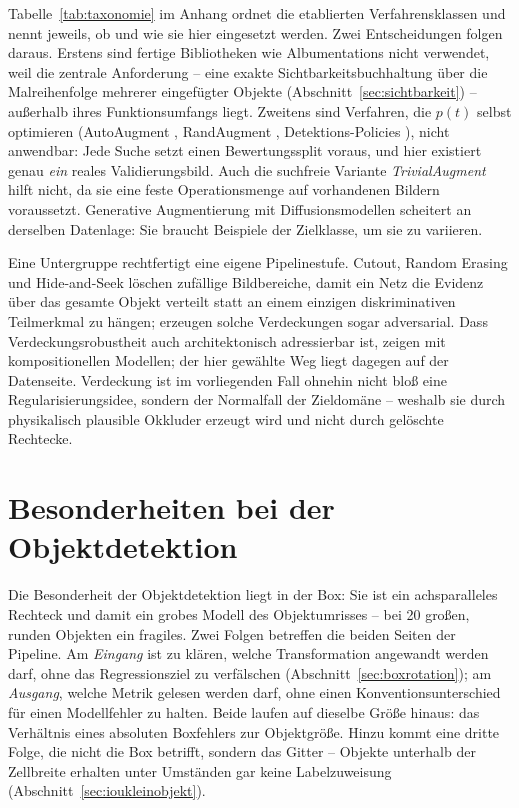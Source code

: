 Tabelle~\ref{tab:taxonomie} im Anhang ordnet die etablierten Verfahrensklassen
und nennt jeweils, ob und wie sie hier eingesetzt werden. Zwei Entscheidungen
folgen daraus. Erstens sind fertige Bibliotheken wie Albumentations
\parencite{buslaev2020} nicht verwendet, weil die zentrale Anforderung -- eine
exakte Sichtbarkeitsbuchhaltung über die Malreihenfolge mehrerer eingefügter
Objekte (Abschnitt~\ref{sec:sichtbarkeit}) -- außerhalb ihres Funktionsumfangs
liegt. Zweitens sind Verfahren, die $p(t)$ selbst optimieren (AutoAugment
\parencite{cubuk2019}, RandAugment \parencite{cubuk2020}, Detektions-Policies
\parencite{zoph2020}), nicht anwendbar: Jede Suche setzt einen Bewertungssplit
voraus, und hier existiert genau \emph{ein} reales Validierungsbild. Auch die
suchfreie Variante \emph{TrivialAugment} \parencite{mueller2021} hilft nicht, da
sie eine feste Operationsmenge auf vorhandenen Bildern voraussetzt. Generative
Augmentierung mit Diffusionsmodellen \parencite{trabucco2024} scheitert an
derselben Datenlage: Sie braucht Beispiele der Zielklasse, um sie zu variieren.

Eine Untergruppe rechtfertigt eine eigene Pipelinestufe. Cutout, Random Erasing
und Hide-and-Seek löschen zufällige Bildbereiche, damit ein Netz die Evidenz über
das gesamte Objekt verteilt statt an einem einzigen diskriminativen Teilmerkmal
zu hängen; \textcite{wang2017afastrcnn} erzeugen solche Verdeckungen sogar
adversarial. Dass Verdeckungsrobustheit auch architektonisch adressierbar ist, zeigen
\textcite{kortylewski2020} mit kompositionellen Modellen; der hier gewählte Weg
liegt dagegen auf der Datenseite. Verdeckung ist im vorliegenden Fall
ohnehin nicht bloß eine Regularisierungsidee, sondern der Normalfall der
Zieldomäne -- weshalb sie durch physikalisch plausible
Okkluder erzeugt wird und nicht durch gelöschte Rechtecke.

\section{Besonderheiten bei der Objektdetektion}
\label{sec:augdetektion}

Die Besonderheit der Objektdetektion liegt in der Box: Sie ist ein achsparalleles
Rechteck und damit ein grobes Modell des Objektumrisses -- bei 20\px{} großen,
runden Objekten ein fragiles. Zwei Folgen betreffen die beiden Seiten der
Pipeline. Am \emph{Eingang} ist zu klären, welche Transformation angewandt werden
darf, ohne das Regressionsziel zu verfälschen
(Abschnitt~\ref{sec:boxrotation}); am \emph{Ausgang}, welche Metrik gelesen
werden darf, ohne einen Konventionsunterschied für einen Modellfehler zu halten.
Beide laufen auf dieselbe Größe hinaus: das Verhältnis eines absoluten
Boxfehlers zur Objektgröße. Hinzu kommt eine dritte Folge, die nicht die Box
betrifft, sondern das Gitter -- Objekte unterhalb der Zellbreite erhalten unter
Umständen gar keine Labelzuweisung (Abschnitt~\ref{sec:ioukleinobjekt}).

